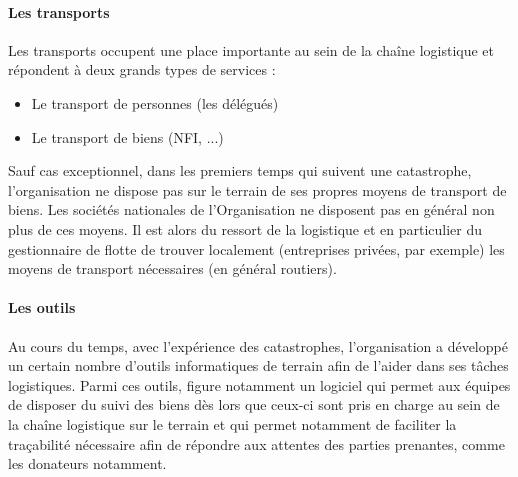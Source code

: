 \paragraph{Les transports}
Les transports occupent une place importante au sein de la chaîne logistique et répondent à deux grands types de services :
\begin{itemize}
\item Le transport de personnes (les délégués)
\item Le transport de biens (NFI, ...)
\end{itemize}
Sauf cas exceptionnel, dans les premiers temps qui suivent une catastrophe, l'organisation ne dispose pas sur le terrain de ses propres moyens de transport de biens. Les sociétés nationales de l'Organisation ne disposent pas en général non plus de ces moyens. Il est alors du ressort de la logistique et en particulier du gestionnaire de flotte de trouver localement (entreprises privées, par exemple) les moyens de transport nécessaires (en général routiers).

\paragraph{Les outils}
Au cours du temps, avec l'expérience des catastrophes, l'organisation a développé un certain nombre d'outils informatiques de terrain afin de l'aider dans ses tâches logistiques. Parmi ces outils, figure notamment un logiciel qui permet aux équipes de disposer du suivi des biens dès lors que ceux-ci sont pris en charge au sein de la chaîne logistique sur le terrain et qui permet notamment de faciliter la traçabilité nécessaire afin de répondre aux attentes des parties prenantes, comme les donateurs notamment.

